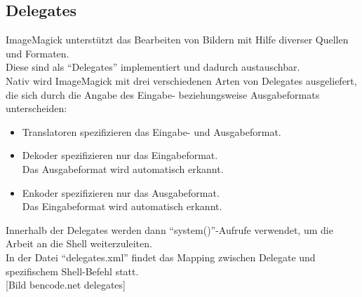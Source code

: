 \subsection{Delegates}\label{subsec:delegates}

ImageMagick unterstützt das Bearbeiten von Bildern mit Hilfe diverser Quellen und Formaten.\\
Diese sind als “Delegates” implementiert und dadurch austauschbar.\\

Nativ wird ImageMagick mit drei verschiedenen Arten von Delegates ausgeliefert, die sich durch die Angabe des Eingabe- beziehungsweise Ausgabeformats unterscheiden:
\begin{itemize}
    \item Translatoren spezifizieren das Eingabe- und Ausgabeformat.
    \item Dekoder spezifizieren nur das Eingabeformat.\\
    Das Ausgabeformat wird automatisch erkannt.
    \item Enkoder spezifizieren nur das Ausgabeformat.\\
    Das Eingabeformat wird automatisch erkannt.
\end{itemize}

Innerhalb der Delegates werden dann “system()”-Aufrufe verwendet, um die Arbeit an die Shell weiterzuleiten.\\

In der Datei “delegates.xml” findet das Mapping zwischen Delegate und spezifischem Shell-Befehl statt.\\

[Bild bencode.net delegates]